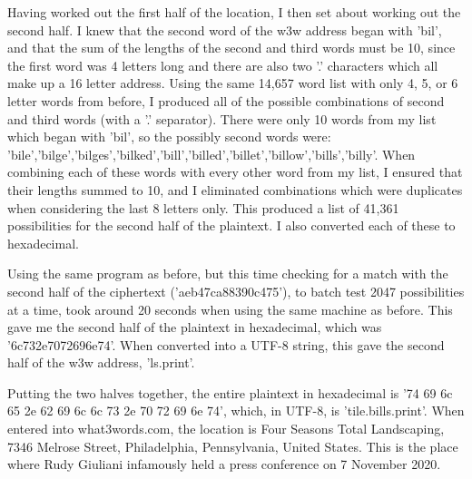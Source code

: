 \documentclass[a4paper, 11pt]{article}
\begin{document}
Having worked out the first half of the location, I then set about working out the second half. 
I knew that the second word of the w3w address began with 'bil', 
and that the sum of the lengths of the second and third words must be 10, 
since the first word was 4 letters long and there are also two '.' characters which all make up a 16 letter address. 
Using the same 14,657 word list with only 4, 5, or 6 letter words from before, I produced all of the possible combinations of second and third words (with a '.' separator). 
There were only 10 words from my list which began with 'bil', so the possibly second words were: 
'bile','bilge','bilges','bilked','bill','billed','billet','billow','bills','billy'. 
When combining each of these words with every other word from my list, I ensured that their lengths summed to 10, 
and I eliminated combinations which were duplicates when considering the last 8 letters only. 
This produced a list of 41,361 possibilities for the second half of the plaintext. 
I also converted each of these to hexadecimal. 

Using the same program as before, but this time checking for a match with the second half of the ciphertext ('aeb47ca88390c475'), 
to batch test 2047 possibilities at a time, took around 20 seconds when using the same machine as before. 
This gave me the second half of the plaintext in hexadecimal, which was '6c732e7072696e74'. 
When converted into a UTF-8 string, this gave the second half of the w3w address, 'ls.print'. 

Putting the two halves together, the entire plaintext in hexadecimal is '74 69 6c 65 2e 62 69 6c 6c 73 2e 70 72 69 6e 74', 
which, in UTF-8, is 'tile.bills.print'. 
When entered into what3words.com, the location is Four Seasons Total Landscaping, 7346 Melrose Street, Philadelphia, Pennsylvania, United States. 
This is the place where Rudy Giuliani infamously held a press conference on 7 November 2020.
\end{document}
